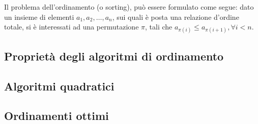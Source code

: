 \documentclass{subfiles}
\begin{document}
Il problema dell'ordinamento (o sorting), può essere formulato come segue: dato un insieme di elementi \(a_{1}, a_{2}, \ldots, a_{n}\), sui quali è posta una relazione d'ordine totale,
si è interessati ad una permutazione \(\pi\), tali che \(a_{\pi(i)} \le a_{\pi(i + 1)}, \forall i < n\).

\subsection{Proprietà degli algoritmi di ordinamento}


\subsection{Algoritmi quadratici}


\subsection{Ordinamenti ottimi}

\end{document}
